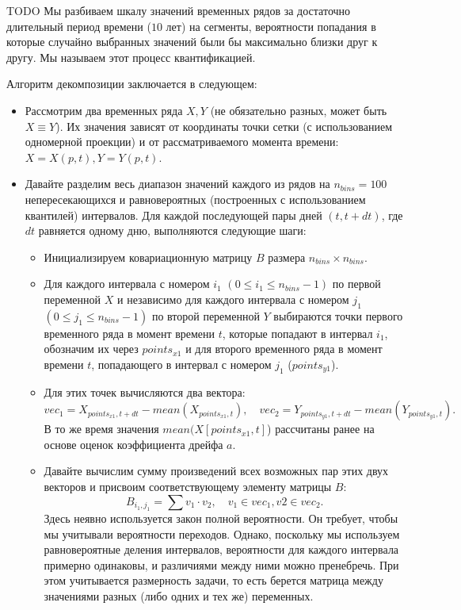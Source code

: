 TODO
Мы разбиваем шкалу значений временных рядов за достаточно длительный период времени ($10$ лет) на сегменты, вероятности попадания в которые случайно выбранных значений были бы максимально близки друг к другу. Мы называем этот процесс квантификацией.

Алгоритм декомпозиции заключается в следующем:
\begin{itemize}
	\item Рассмотрим два временных ряда $X,Y$ (не обязательно разных, может быть $X \equiv Y$). Их значения зависят от координаты точки сетки (с использованием одномерной проекции) и от рассматриваемого момента времени: $X=X(p,t), Y=Y(p,t)$. 
	\item Давайте разделим весь диапазон значений каждого из рядов на $n_{bins}=100$ непересекающихся и равновероятных (построенных с использованием квантилей) интервалов. Для каждой последующей пары дней $(t,t+dt)$, где $dt$ равняется одному дню, выполняются следующие шаги:
	\begin{itemize}
		\item Инициализируем ковариационную матрицу $B$ размера $n_{bins} \times n_{bins}$.
		
		\item Для каждого интервала с номером $i_1$ $(0 \leqslant i_1 \leqslant n_{bins}-1)$ по первой переменной $X$ и независимо для каждого интервала с номером $j_1$ $(0 \leqslant j_1 \leqslant n_{bins}-1)$ по второй переменной $Y$ выбираются точки первого временного ряда в момент времени $t$, которые попадают в интервал $i_1$, обозначим их через $points_{x1}$ и для второго временного ряда в момент времени $t$, попадающего в интервал с номером $j_1$ ($points_{y1}$).
		
		
		\item Для этих точек вычисляются два вектора:
		\begin{equation*}
			vec_1 = X_{points_{x1},t+dt} - mean(X_{points_{x1},t}),\quad
			vec_2 = Y_{points_{y1},t+dt} - mean(Y_{points_{y1},t}).
		\end{equation*}
		В то же время значения $mean(X[points_{x1},t]$) рассчитаны ранее на основе оценок коэффициента дрейфа $a$.
		
		\item Давайте вычислим сумму произведений всех возможных пар этих двух векторов и присвоим соответствующему элементу матрицы $B$:
		\begin{equation*}
			B_{i_1, j_1} = \sum v_1 \cdot v_2, \quad v_1 \in vec_1, v2 \in vec_2.
		\end{equation*}
		Здесь неявно используется закон полной вероятности. Он требует, чтобы мы учитывали вероятности переходов. Однако, поскольку мы используем равновероятные деления интервалов, вероятности для каждого интервала примерно одинаковы, и различиями между ними можно пренебречь. При этом учитывается размерность задачи, то есть берется матрица между значениями разных (либо одних и тех же) переменных.
		

\end{itemize}
\end{itemize}

